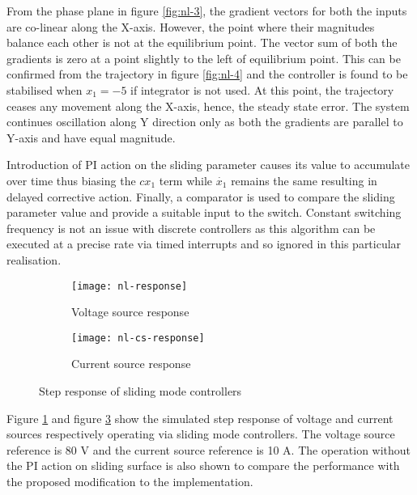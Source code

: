 	From the phase plane in figure \ref{fig:nl-3}, the gradient vectors for both the inputs are co-linear along the X-axis. However, the point where their magnitudes balance each other is not at the equilibrium point. The vector sum of both the gradients is zero at a point slightly to the left of equilibrium point. This can be confirmed from the trajectory in figure \ref{fig:nl-4} and the controller is found to be stabilised when $x_1=-5$ if integrator is not used. At this point, the trajectory ceases any movement along the X-axis, hence, the steady state error. The system continues oscillation along Y direction only as both the gradients are parallel to Y-axis and have equal magnitude.
	
	Introduction of PI action \cite{spiazzi1997sliding} on the sliding parameter causes its value to accumulate over time thus biasing the $cx_1$ term while $\dot{x_1}$ remains the same resulting in delayed corrective action. Finally, a comparator is used to compare the sliding parameter value and provide a suitable input to the switch. Constant switching frequency is not an issue with discrete controllers as this algorithm can be executed at a precise rate via timed interrupts and so ignored in this particular realisation. 
    \begin{figure}[h]
        \begin{subfigure}{.49\textwidth}
            \centering
            \texttt{[image: nl-response]}
            \caption{Voltage source response}
            \label{fig:nl-6}
        \end{subfigure}
        \begin{subfigure}{.49\textwidth}
            \centering
            \texttt{[image: nl-cs-response]}
            \caption{Current source response}
            \label{fig:nl-7}
	    \end{subfigure}
	    \caption{Step response of sliding mode controllers}
	\end{figure}
	Figure \ref{fig:nl-6} and figure \ref{fig:nl-7} show the simulated step response of voltage and current sources respectively operating via sliding mode controllers. The voltage source reference is 80 V and the current source reference is 10 A. The operation without the PI action on sliding surface is also shown to compare the performance with the proposed modification to the implementation.
